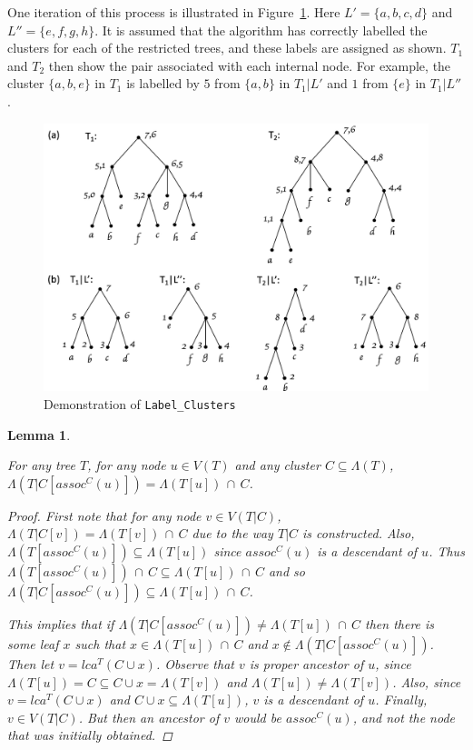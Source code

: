 \documentclass{article}
\newcommand{\leafset}{\Lambda}
\newtheorem{assocnode}[incompatibility]{Lemma}
\begin{document}
    One iteration of this process is illustrated in Figure~\ref{fig:labelclusters}. Here $L' = \{a, b, c, d\}$ and $L'' = \{e, f, g, h\}$. It is assumed that the algorithm has correctly labelled the clusters for each of the restricted trees, and these labels are assigned as shown. $T_1$ and $T_2$ then show the pair associated with each internal node. For example, the cluster $\{a, b, e\}$ in $T_1$ is labelled by $5$ from $\{a, b\}$ in $T_1|L'$ and $1$ from $\{e\}$ in $T_1|L''$.

    \begin{figure}[h]
        \includegraphics[scale=0.5]{labelclusters}
        \centering
        \caption{Demonstration of \texttt{Label\_Clusters}}
        \label{fig:labelclusters}
    \end{figure}

    \bigskip
    \begin{assocnode}
        \label{lem:assocnode}

        For any tree $T$, for any node $u \in V(T)$ and any cluster $C \subseteq \leafset(T)$, $\leafset(T|C[assoc^C(u)]) = \leafset(T[u])\, \cap\, C$.

        \begin{proof}
            First note that for any node $v \in V(T|C)$, $\leafset(T|C[v]) = \leafset(T[v])\, \cap\, C$ due to the way $T|C$ is constructed. Also, $\leafset(T[assoc^C(u)]) \subseteq \leafset(T[u])$ since $assoc^C(u)$ is a descendant of $u$. Thus $\leafset(T[assoc^C(u)])\, \cap\, C \subseteq \leafset(T[u])\, \cap\, C$ and so $\leafset(T|C[assoc^C(u)]) \subseteq \leafset(T[u])\, \cap\, C$.

            This implies that if $\leafset(T|C[assoc^C(u)]) \neq \leafset(T[u])\, \cap\, C$ then there is some leaf $x$ such that $x \in \leafset(T[u])\, \cap\, C$ and $x \not\in \leafset(T|C[assoc^C(u)])$. Then let $v = lca^T(C \cup x)$. Observe that $v$ is proper ancestor of $u$, since $\leafset(T[u]) = C \subseteq C \cup x = \leafset(T[v])$ and $\leafset(T[u]) \neq \leafset(T[v])$. Also, since $v = lca^T(C \cup x)$ and $C \cup x \subseteq \leafset(T[u])$, $v$ is a descendant of $u$. Finally, $v \in V(T|C)$. But then an ancestor of $v$ would be $assoc^C(u)$, and not the node that was initially obtained.
        \end{proof}
    \end{assocnode}
\end{document}
